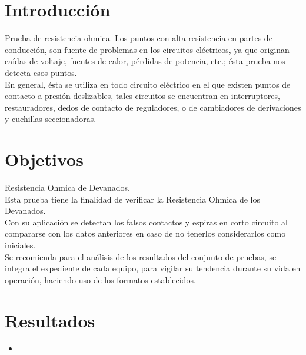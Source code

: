 \documentclass[]{article}
\begin{document}
	





\section{Introducción}

Prueba de resistencia ohmica. Los puntos con alta resistencia en partes de conducción, son fuente de problemas en los circuitos eléctricos, ya que originan caídas de voltaje, fuentes de calor, pérdidas de potencia, etc.; ésta prueba nos detecta esos puntos.\\

En general, ésta se utiliza en todo circuito eléctrico en el que existen puntos de contacto a presión deslizables, tales circuitos se encuentran en interruptores, restauradores, dedos de contacto de reguladores, o de cambiadores de derivaciones y cuchillas seccionadoras.\\

\section{Objetivos}

Resistencia Ohmica de Devanados.\\

Esta prueba tiene la finalidad de verificar la Resistencia Ohmica de los Devanados.\\

Con su aplicación se detectan los falsos contactos y espiras en corto circuito al compararse con los datos anteriores en caso de no tenerlos considerarlos como iniciales.\\

Se recomienda para el análisis de los resultados del conjunto de pruebas, se integra el expediente de cada equipo, para vigilar su tendencia durante su vida en operación, haciendo uso de los formatos establecidos.\\

\section{Resultados}


\begin{itemize}
	\item 
\end{itemize}




%
%
\end{document}

